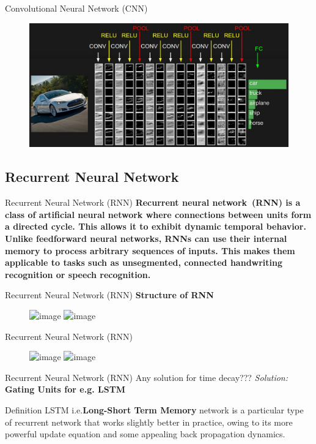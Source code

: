 \documentclass[10pt]{beamer}
\begin{document}
	\begin{frame}[c]{Convolutional Neural Network (CNN)}
		\begin{figure}
			\includegraphics[width=0.9\linewidth]{images/convnet}
		\end{figure}
	\end{frame}	
	\subsection{Recurrent Neural Network}
	\begin{frame}[t]{Recurrent Neural Network (RNN)}
		\large{\textbf{Recurrent neural network (RNN) is a class of artificial neural network where connections between units form a directed cycle. This allows it to exhibit dynamic temporal behavior. Unlike feedforward neural networks, RNNs can use their internal memory to process arbitrary sequences of
		inputs. This makes them applicable to tasks such as unsegmented, connected handwriting recognition or speech recognition.}}
	\end{frame}
	\begin{frame}[c]{Recurrent Neural Network (RNN)}
		\large{\textbf{Structure of RNN}}
		\begin{figure}[ht]
			\includegraphics<1>[width=\linewidth]{images/rnn2.jpg}
			\includegraphics<2>[width=\linewidth]{images/rnn1.jpg}
		\end{figure}
	\end{frame}	
	\begin{frame}[c]{Recurrent Neural Network (RNN)}
		\begin{figure}[ht]
			\includegraphics<1>[width=\linewidth]{images/rnn4.jpg}
			\includegraphics<2>[width=\linewidth]{images/rnn6.jpg}
		\end{figure}
	\end{frame}
	\begin{frame}[c]{Recurrent Neural Network (RNN)}
		\large{Any solution for time decay???}
		\large{\textit{Solution:} \textbf{Gating Units for e.g. LSTM}}
			\begin{block}{Definition}
				LSTM i.e.\textbf{Long-Short Term Memory} network is a particular type of recurrent
				network that works slightly better in practice, owing to its more powerful update
				equation and some appealing back propagation dynamics.
			\end{block}
	\end{frame}
		
\end{document}

